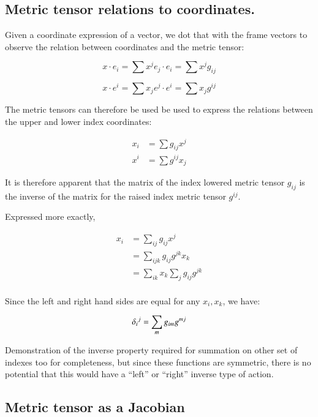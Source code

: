 \documentclass{article}      %
\begin{document}
\subsection{ Metric tensor relations to coordinates. }

Given a coordinate expression of a vector, we dot that with the frame vectors to observe the relation between coordinates and the metric tensor:

\[
x \cdot e_i = \sum x^j e_j \cdot e_i = \sum x^j g_{ij}
\]

\[
x \cdot e^i = \sum x_j e^j \cdot e^i = \sum x_j g^{ij}
\]

The metric tensors can therefore be used be used to express the relations between the upper and lower index coordinates:

\begin{align}
x_i &= \sum g_{ij} x^j \label{eqn:metric_upper_to_lower} \\
x^i &= \sum g^{ij} x_j \label{eqn:metric_lower_to_upper}
\end{align}

It is therefore apparent that the matrix of the index lowered metric tensor $g_{ij}$ is the inverse of the matrix for the raised index metric tensor $g^{ij}$.

Expressed more exactly, 

\begin{align*}
x_i
&= \sum_{ij} g_{ij} x^j \\
&= \sum_{ijk} g_{ij} g^{jk} x_k \\
&= \sum_{ik} x_k \sum_j g_{ij} g^{jk} \\
\end{align*}

Since the left and right hand sides are equal for any $x_i, x_k$, we have:

\begin{equation}
{\delta_{i}}^j = \sum_m g_{im} g^{mj} \\
\end{equation}

Demonstration of the inverse property required for summation on other set of indexes too for completeness, but since these functions are symmetric, there 
is no potential that this would have a ``left'' or ``right'' inverse type of action.

\subsection{ Metric tensor as a Jacobian }
\end{document}
